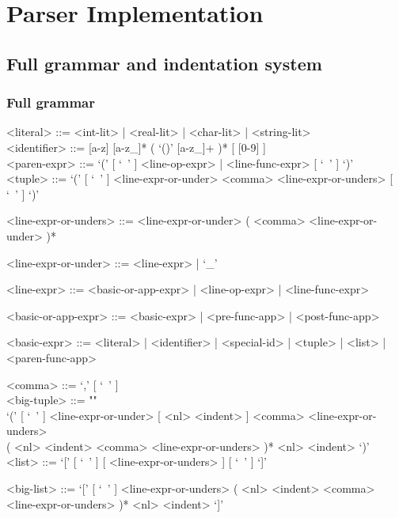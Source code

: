\documentclass{article}
\begin{document}
\newpage

\section{Parser Implementation}

\subsection{Full grammar and indentation system}

\subsubsection{Full grammar}

\begin{grammar}

<literal> ::= <int-lit> | <real-lit> | <char-lit> | <string-lit>
\\

<identifier> ::= [a-z] [a-z_]* ( `()' [a-z_]+ )* [ [0-9] ]
\\

<paren-expr> ::= `(' [ `\ ' ] <line-op-expr> | <line-func-expr> [ `\ ' ] `)'  
\\

<tuple> ::=
`(' [ `\ ' ] <line-expr-or-under> <comma> <line-expr-or-unders> [ `\ ' ] `)'

<line-expr-or-unders> ::=
<line-expr-or-under> ( <comma> <line-expr-or-under> )*

<line-expr-or-under> ::= <line-expr> | `_'

<line-expr> ::= <basic-or-app-expr> | <line-op-expr> | <line-func-expr>

<basic-or-app-expr> ::= <basic-expr> | <pre-func-app> | <post-func-app>

<basic-expr> ::=
<literal> | <identifier> | <special-id> | <tuple> | <list> | <paren-func-app>

<comma> ::= `,' [ `\ ' ]
\\

<big-tuple> ::= ""\\
`(' [ `\ ' ] <line-expr-or-under> [ <nl> <indent> ]
<comma> <line-expr-or-unders> \\
( <nl> <indent> <comma> <line-expr-or-unders> )* 
<nl> <indent> `)'
\\

<list> ::= `[' [ `\ ' ] [ <line-expr-or-unders> ] [ `\ ' ] `]'

<big-list> ::= 
`[' [ `\ ' ] <line-expr-or-unders>
( <nl> <indent> <comma> <line-expr-or-unders> )* <nl> <indent> `]'
\\


\end{grammar}
\end{document}
